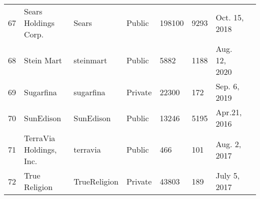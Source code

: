 \documentclass[9pt,twoside,lineno]{pnas-new}
\begin{document}
\begin{longtable}{llllllll}
67          & Sears Holdings Corp.                                                            & Sears                                                               & Public           & 198100             & 9293               & Oct. 15, 2018                                                                                                                      \\
68          & Stein Mart                                                                      & steinmart                                                           & Public           & 5882               & 1188               & Aug. 12, 2020                                                                                                                       \\
69          & Sugarfina                                                                       & sugarfina                                                           & Private          & 22300              & 172                & Sep. 6, 2019                                                                                                                     \\
70          & SunEdison                                                                       & SunEdison                                                           & Public           & 13246              & 5195           & Apr.21, 2016                                                                                                                        \\
71          & TerraVia Holdings, Inc.                                                         & terravia                                                            & Public           & 466                & 101                & Aug. 2, 2017                                                                                                                        \\
72          & True Religion       & TrueReligion                                                        & Private          & 43803              & 189                & July 5, 2017                                                                                                                          \\

\end{longtable}
\end{document}
